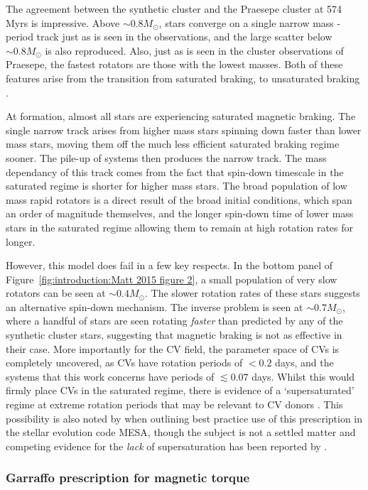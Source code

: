 The agreement between the synthetic cluster and the Praesepe cluster at 574 Myrs is impressive. Above $\sim 0.8 M_\odot$, stars converge on a single narrow mass - period track just as is seen in the observations, and the large scatter below $\sim 0.8 M_\odot$ is also reproduced. Also, just as is seen in the cluster observations of Praesepe, the fastest rotators are those with the lowest masses. Both of these features arise from the transition from saturated braking, to unsaturated braking \citep{matt2015}.

At formation, almost all stars are experiencing saturated magnetic braking. The single narrow track arises from higher mass stars spinning down faster than lower mass stars, moving them off the much less efficient saturated braking regime sooner. The pile-up of systems then produces the narrow track. The mass dependancy of this track comes from the fact that spin-down timescale in the saturated regime is shorter for higher mass stars.
The broad population of low mass rapid rotators is a direct result of the broad initial conditions, which span an order of magnitude themselves, and the longer spin-down time of lower mass stars in the saturated regime allowing them to remain at high rotation rates for longer.

However, this model does fail in a few key respects. In the bottom panel of Figure~\ref{fig:introduction:Matt 2015 figure 2}, a small population of very slow rotators can be seen at $\sim 0.4 M_\odot$. The slower rotation rates of these stars suggests an alternative spin-down mechanism. The inverse problem is seen at $\sim 0.7 M_\odot$, where a handful of stars are seen rotating {\it faster} than predicted by any of the synthetic cluster stars, suggesting that magnetic braking is not as effective in their case.
More importantly for the CV field, the parameter space of CVs is completely uncovered, as CVs have rotation periods of $< 0.2$ days, and the systems that this work concerns have periods of $\lesssim 0.07$ days. Whilst this would firmly place CVs in the saturated regime, there is evidence of a `supersaturated' regime at extreme rotation periods that may be relevant to CV donors \citep{James2000, Wright2011, Argiroffi2016}. This possibility is also noted by \citet{Gossage2021} when outlining best practice use of this prescription in the stellar evolution code MESA, though the subject is not a settled matter and competing evidence for the {\it lack} of supersaturation has been reported by \citet{jeffries2011}.


\subsubsection{Garraffo prescription for magnetic torque}
\label{sect:introduction:Garraffo magnetic braking prescription}

